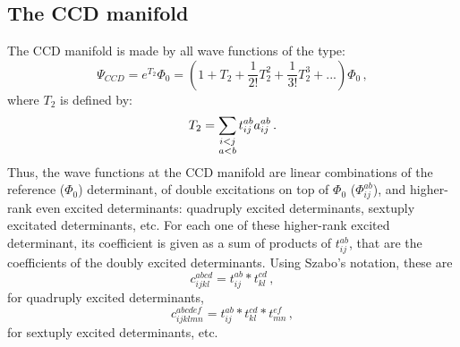 \subsection{The CCD manifold}

The CCD manifold is made by all wave functions of the type:
\begin{equation}
  \Psi_{CCD} = e^{T_2} \Phi_0 = (1 + T_2 + \frac{1}{2!}T_2^2 + \frac{1}{3!}T_2^3 + ...) \Phi_0\,,
\end{equation}
where $T_2$ is defined by:
\begin{equation}
  T_2 = \sum_{\mathclap{\substack{
        i<j\\
        a<b}}} t_{ij}^{ab} a_{ij}^{ab}\,.
\end{equation}
Thus, the wave functions at the CCD manifold are linear combinations of the reference ($\Phi_0$) determinant,
of double excitations on top of $\Phi_0$ ($\Phi_{ij}^{ab}$), and higher-rank even excited determinants:
quadruply excited determinants, sextuply excitated determinants, etc.
For each one of these higher-rank excited determinant, its coefficient is given as a sum of products
of $t_{ij}^{ab}$, that are the coefficients of the doubly excited determinants.
Using Szabo's notation, these are
\begin{equation}
  c_{ijkl}^{abcd} = t_{ij}^{ab} * t_{kl}^{cd}\,,
\end{equation}
for quadruply excited determinants,
\begin{equation}
  c_{ijklmn}^{abcdef} = t_{ij}^{ab} * t_{kl}^{cd} * t_{mn}^{ef}\,,
\end{equation}
for sextuply excited determinants, etc.

